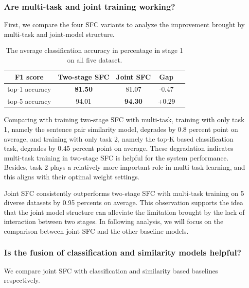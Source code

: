 \documentclass[letterpaper]{article} %
\providecommand{\tabularnewline}{\\}
\begin{document}
  \subsubsection*{Are multi-task and joint training working?} 
  First, we compare the four  SFC  variants to analyze the improvement
  brought  by  multi-task  and  joint-model  structure. 

  \begin{table}
    \begin{centering}
      \begin{tabular}{|c|c|c|c|c|}
        \hline
        F1 score & Two-stage SFC & Joint SFC & Gap & \tabularnewline
        \hline
        top-1 accuracy  & \textbf{81.50} & 81.07 & -0.47 & \tabularnewline
        top-5 accuracy & 94.01 & \textbf{94.30} & +0.29 & \tabularnewline
        \hline
      \end{tabular}
      \par
    \end{centering}
    \caption{The average classification accuracy in percentage in stage 1 on all five dataset.}
    \label{tbe:top1_5_accuracy}
  \end{table}

  Comparing with training two-stage SFC with multi-task, training with only task
  1,  namely the sentence pair similarity model, degrades by 0.8 percent
  point  on average, and training with only task 2, namely the top-K based
  classification  task,  degrades  by  0.45  percent  point  on  average.  These
  degradation  indicates  multi-task training in two-stage SFC is helpful for the
  system  performance.  Besides, task 2 plays a relatively more important role in
  multi-task learning, and this aligns with their optimal weight settings.

  Joint SFC consistently outperforms two-stage SFC with multi-task training  
  on 5 diverse datasets by 0.95 percents  on  average. 
  This observation supports the idea that the joint model
  structure  can  alleviate  the  limitation  brought by the lack of interaction
  between  two  stages.  In  following analysis, we will focus on the comparison
  between joint SFC and the other baseline models.

  \subsubsection*{Is  the  fusion of classification and similarity models
  helpful?}  We  compare  joint SFC with classification and similarity based
  baselines respectively.
\end{document}

